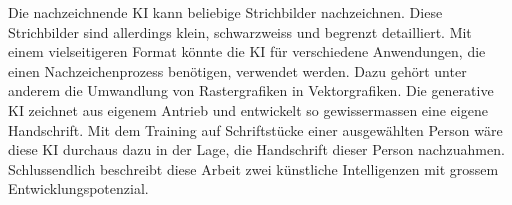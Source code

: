 Die nachzeichnende KI kann beliebige Strichbilder nachzeichnen. Diese
Strichbilder sind allerdings klein, schwarzweiss und begrenzt detailliert.
Mit einem vielseitigeren Format könnte die KI für verschiedene Anwendungen, die
einen Nachzeichenprozess benötigen, verwendet werden. Dazu gehört unter anderem
die Umwandlung von Rastergrafiken in Vektorgrafiken. Die generative KI zeichnet
aus eigenem Antrieb und entwickelt so gewissermassen eine eigene Handschrift.
Mit dem Training auf Schriftstücke einer ausgewählten Person wäre diese KI
durchaus dazu in der Lage, die Handschrift dieser Person nachzuahmen.
Schlussendlich beschreibt diese Arbeit zwei künstliche Intelligenzen mit grossem
Entwicklungspotenzial.